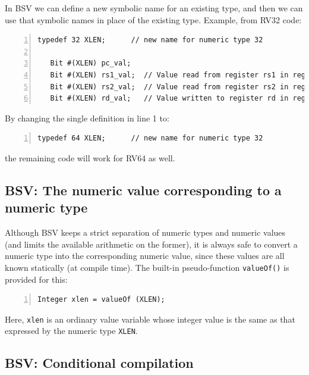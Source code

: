 
In BSV we can define a new symbolic name for an existing type, and
then we can use that symbolic names in place of the existing
type. Example, from RV32 code:

\begin{Verbatim}[frame=single, numbers=left]
   typedef 32 XLEN;      // new name for numeric type 32

   Bit #(XLEN) pc_val;
   Bit #(XLEN) rs1_val;  // Value read from register rs1 in register file
   Bit #(XLEN) rs2_val;  // Value read from register rs2 in register file
   Bit #(XLEN) rd_val;   // Value written to register rd in register file
\end{Verbatim}

By changing the single definition in line 1 to:
\begin{Verbatim}[frame=single, numbers=left]
   typedef 64 XLEN;      // new name for numeric type 32
\end{Verbatim}
the remaining code will work for RV64 as well.


\subsection{BSV: The numeric value corresponding to a numeric type}

\label{BSV_value_of_numeric_type}


Although BSV keeps a strict separation of numeric types and numeric
values (and limits the available arithmetic on the former), it is
always safe to convert a numeric type into the corresponding numeric
value, since these values are all known statically (at compile time).
The built-in pseudo-function \verb|valueOf()| is provided for this:

\begin{Verbatim}[frame=single, numbers=left]
   Integer xlen = valueOf (XLEN);
\end{Verbatim}

Here, \verb|xlen| is an ordinary value variable whose integer value is
the same as that expressed by the numeric type \verb|XLEN|.


\subsection{BSV: Conditional compilation}

